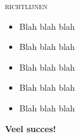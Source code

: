 \documentclass[dutch]{ucll-exam}
\begin{document}
\begin{examguidelines}
  \begin{center}
    \textsc{\Huge richtlijnen}
  \end{center}
  \vskip4mm
  \large
  \begin{itemize}
    \item Blah blah blah
    \item Blah blah blah
    \item Blah blah blah
    \item Blah blah blah
    \item Blah blah blah
  \end{itemize}

  \begin{center} \bfseries\Large
    Veel succes!
  \end{center}
\end{examguidelines}
\end{document}
